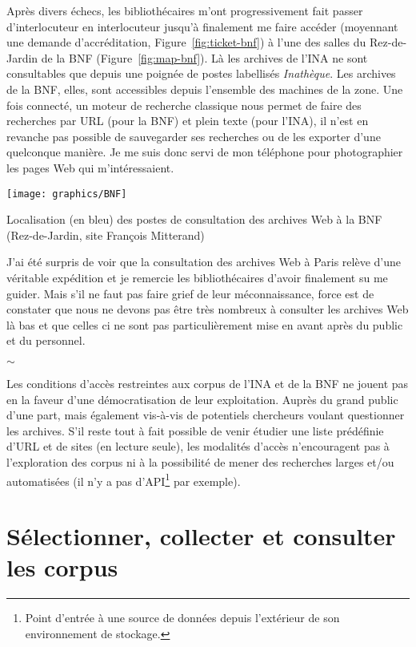 \documentclass[symmetric,justified,marginals=raggedouter]{tufte-book}
\begin{document}
Après divers échecs, les bibliothécaires m'ont progressivement fait passer d'interlocuteur en interlocuteur jusqu'à finalement me faire accéder (moyennant une demande d'accréditation, Figure~\ref{fig:ticket-bnf}) à l'une des salles du Rez-de-Jardin de la BNF (Figure~\ref{fig:map-bnf}). Là les archives de l'INA ne sont consultables que depuis une poignée de postes labellisés \textit{Inathèque}. Les archives de la BNF, elles, sont accessibles depuis l'ensemble des  machines de la zone. Une fois connecté, un moteur de recherche classique nous permet de faire des recherches par URL (pour la BNF) et plein texte (pour l'INA), il n'est en revanche pas possible de sauvegarder ses recherches ou de les exporter d'une quelconque manière. Je me suis donc servi de mon téléphone pour photographier les pages Web qui m'intéressaient.

\begin{marginfigure}%
  \texttt{[image: graphics/BNF]}
  \caption{Localisation (en bleu) des postes de consultation des archives Web à la BNF (Rez-de-Jardin, site François Mitterand)}
  \label{fig:map-bnf}
\end{marginfigure} 

J'ai été surpris de voir que la consultation des archives Web à Paris relève d'une véritable expédition et je remercie les bibliothécaires d'avoir finalement su me guider. Mais s'il ne faut pas faire grief de leur méconnaissance, force est de constater que nous ne devons pas être très nombreux à consulter les archives Web là bas et que celles ci ne sont pas particulièrement mise en avant après du public et du personnel.

\begin{center}
	$\sim$
\end{center}
  
\noindent Les conditions d'accès restreintes aux corpus de l'INA et de la BNF ne jouent pas en la faveur d'une démocratisation de leur exploitation. Auprès du grand public d'une part, mais également vis-à-vis de potentiels chercheurs voulant questionner les archives. S'il reste tout à fait possible de venir étudier une liste prédéfinie d'URL et de sites (en lecture seule), les modalités d'accès n'encouragent pas à l'exploration des corpus ni à la possibilité de mener des recherches larges et/ou automatisées (il n'y a pas d'API\footnote{\RaggedOuter Point d'entrée à une source de données depuis l'extérieur de son environnement de stockage.} par exemple). 

\section{Sélectionner, collecter et consulter les corpus}
\label{sec:3_constituer}
\end{document}
